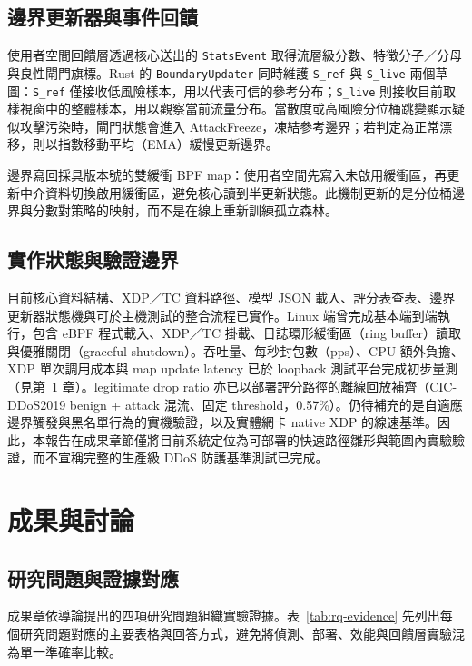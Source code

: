 \documentclass[12pt, a4paper, fontset=none]{ctexart}
\newcommand{\code}[1]{\texttt{#1}}
\begin{document}
\subsection{邊界更新器與事件回饋}
使用者空間回饋層透過核心送出的 \code{StatsEvent} 取得流層級分數、特徵分子／分母與良性閘門旗標。Rust 的 \code{BoundaryUpdater} 同時維護 \code{S\_ref} 與 \code{S\_live} 兩個草圖：\code{S\_ref} 僅接收低風險樣本，用以代表可信的參考分布；\code{S\_live} 則接收目前取樣視窗中的整體樣本，用以觀察當前流量分布。當散度或高風險分位桶跳變顯示疑似攻擊污染時，閘門狀態會進入 AttackFreeze，凍結參考邊界；若判定為正常漂移，則以指數移動平均（EMA）緩慢更新邊界。

邊界寫回採具版本號的雙緩衝 BPF map：使用者空間先寫入未啟用緩衝區，再更新中介資料切換啟用緩衝區，避免核心讀到半更新狀態。此機制更新的是分位桶邊界與分數對策略的映射，而不是在線上重新訓練孤立森林。

\subsection{實作狀態與驗證邊界}
目前核心資料結構、XDP／TC 資料路徑、模型 JSON 載入、評分表查表、邊界更新器狀態機與可於主機測試的整合流程已實作。Linux 端曾完成基本端到端執行，包含 eBPF 程式載入、XDP／TC 掛載、日誌環形緩衝區（ring buffer）讀取與優雅關閉（graceful shutdown）。吞吐量、每秒封包數（pps）、CPU 額外負擔、XDP 單次調用成本與 map update latency 已於 loopback 測試平台完成初步量測（見第~\ref{sec:results} 章）。legitimate drop ratio 亦已以部署評分路徑的離線回放補齊（CIC-DDoS2019 benign + attack 混流、固定 threshold，0.57\%）。仍待補充的是自適應邊界觸發與黑名單行為的實機驗證，以及實體網卡 native XDP 的線速基準。因此，本報告在成果章節僅將目前系統定位為可部署的快速路徑雛形與範圍內實驗驗證，而不宣稱完整的生產級 DDoS 防護基準測試已完成。

\section{成果與討論}
\label{sec:results}

\subsection{研究問題與證據對應}
成果章依導論提出的四項研究問題組織實驗證據。表~\ref{tab:rq-evidence} 先列出每個研究問題對應的主要表格與回答方式，避免將偵測、部署、效能與回饋層實驗混為單一準確率比較。
\end{document}
